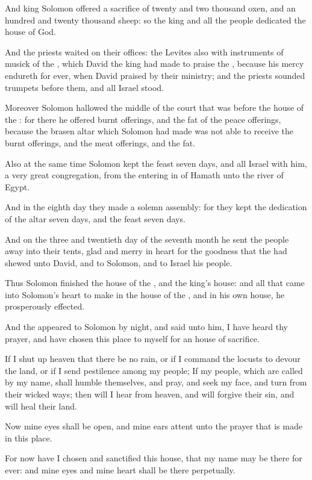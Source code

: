 \Verse And king Solomon offered a sacrifice of twenty and two thousand oxen, and an hundred and twenty thousand sheep: so the king and all the people dedicated the house of God.

\Verse And the priests waited on their offices: the Levites also with instruments of musick of the \LORD, which David the king had made to praise the \LORD, because his mercy endureth for ever, when David praised by their ministry; and the priests sounded trumpets before them, and all Israel stood.

\Verse Moreover Solomon hallowed the middle of the court that was before the house of the \LORD: for there he offered burnt offerings, and the fat of the peace offerings, because the brasen altar which Solomon had made was not able to receive the burnt offerings, and the meat offerings, and the fat.

\Verse Also at the same time Solomon kept the feast seven days, and all Israel with him, a very great congregation, from the entering in of Hamath unto the river of Egypt.

\Verse And in the eighth day they made a solemn assembly: for they kept the dedication of the altar seven days, and the feast seven days.

\Verse And on the three and twentieth day of the seventh month he sent the people away into their tents, glad and merry in heart for the goodness that the \LORD had shewed unto David, and to Solomon, and to Israel his people.

\Verse Thus Solomon finished the house of the \LORD, and the king's house: and all that came into Solomon's heart to make in the house of the \LORD, and in his own house, he prosperously effected.

\Verse And the \LORD appeared to Solomon by night, and said unto him, I have heard thy prayer, and have chosen this place to myself for an house of sacrifice.

\Verse If I shut up heaven that there be no rain, or if I command the locusts to devour the land, or if I send pestilence among my people; \Verse If my people, which are called by my name, shall humble themselves, and pray, and seek my face, and turn from their wicked ways; then will I hear from heaven, and will forgive their sin, and will heal their land.

\Verse Now mine eyes shall be open, and mine ears attent unto the prayer that is made in this place.

\Verse For now have I chosen and sanctified this house, that my name may be there for ever: and mine eyes and mine heart shall be there perpetually.

